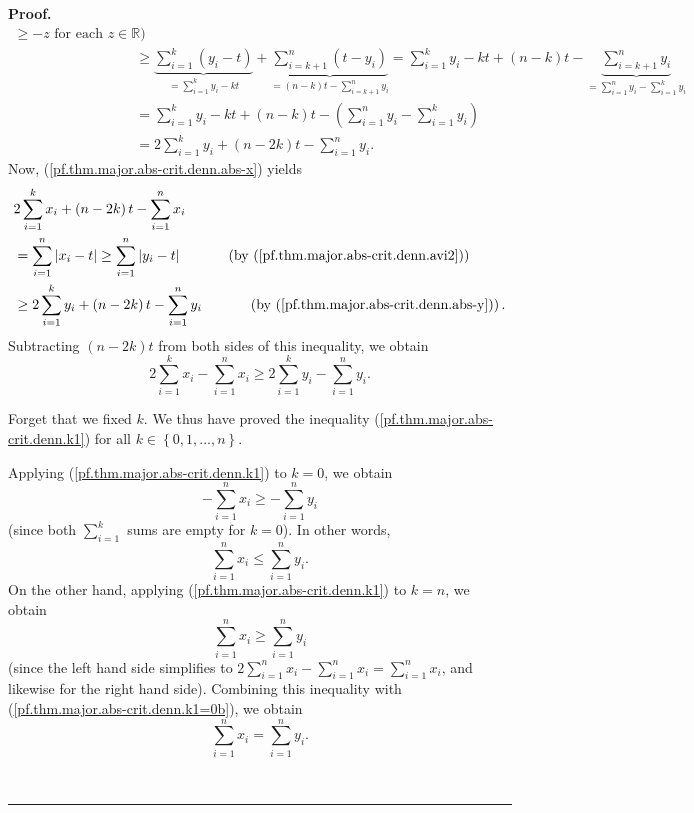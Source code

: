 \documentclass[numbers=enddot,12pt,final,onecolumn,notitlepage]{scrartcl}%
\numberwithin{exer}{subsection}
\theoremstyle{definition}
\newenvironment{proof}[1][Proof]{\noindent\textbf{#1.} }{\ \rule{0.5em}{0.5em}}
\let\sumnonlimits\sum
\renewcommand{\sum}{\sumnonlimits\limits}
\begin{document}
\begin{proof}
\begin{align}
{{\geq-z\text{ for each }z\in\mathbb{R}\text{)}}}\nonumber\\
&  \geq\underbrace{\sum_{i=1}^{k}\left(  y_{i}-t\right)  }_{=\sum_{i=1}%
^{k}y_{i}-kt}+\underbrace{\sum_{i=k+1}^{n}\left(  t-y_{i}\right)  }_{=\left(
n-k\right)  t-\sum_{i=k+1}^{n}y_{i}}=\sum_{i=1}^{k}y_{i}-kt+\left(
n-k\right)  t-\underbrace{\sum_{i=k+1}^{n}y_{i}}_{=\sum_{i=1}^{n}y_{i}%
-\sum_{i=1}^{k}y_{i}}\nonumber\\
&  =\sum_{i=1}^{k}y_{i}-kt+\left(  n-k\right)  t-\left(  \sum_{i=1}^{n}%
y_{i}-\sum_{i=1}^{k}y_{i}\right) \nonumber\\
&  =2\sum_{i=1}^{k}y_{i}+\left(  n-2k\right)  t-\sum_{i=1}^{n}y_{i}.
\label{pf.thm.major.abs-crit.denn.abs-y}%
\end{align}
Now, (\ref{pf.thm.major.abs-crit.denn.abs-x}) yields%
\begin{align*}
&  2\sum_{i=1}^{k}x_{i}+\left(  n-2k\right)  t-\sum_{i=1}^{n}x_{i}\\
&  =\sum_{i=1}^{n}\left\vert x_{i}-t\right\vert \geq\sum_{i=1}^{n}\left\vert
y_{i}-t\right\vert \ \ \ \ \ \ \ \ \ \ \left(  \text{by
(\ref{pf.thm.major.abs-crit.denn.avi2})}\right) \\
&  \geq2\sum_{i=1}^{k}y_{i}+\left(  n-2k\right)  t-\sum_{i=1}^{n}%
y_{i}\ \ \ \ \ \ \ \ \ \ \left(  \text{by
(\ref{pf.thm.major.abs-crit.denn.abs-y})}\right)  .
\end{align*}
Subtracting $\left(  n-2k\right)  t$ from both sides of this inequality, we
obtain%
\begin{equation}
2\sum_{i=1}^{k}x_{i}-\sum_{i=1}^{n}x_{i}\geq2\sum_{i=1}^{k}y_{i}-\sum
_{i=1}^{n}y_{i}. \label{pf.thm.major.abs-crit.denn.k1}%
\end{equation}


Forget that we fixed $k$. We thus have proved the inequality
(\ref{pf.thm.major.abs-crit.denn.k1}) for all $k\in\left\{  0,1,\ldots
,n\right\}  $.

Applying (\ref{pf.thm.major.abs-crit.denn.k1}) to $k=0$, we obtain%
\begin{equation}
-\sum_{i=1}^{n}x_{i}\geq-\sum_{i=1}^{n}y_{i}
\label{pf.thm.major.abs-crit.denn.k1=0}%
\end{equation}
(since both $\sum_{i=1}^{k}$ sums are empty for $k=0$). In other words,%
\begin{equation}
\sum_{i=1}^{n}x_{i}\leq\sum_{i=1}^{n}y_{i}.
\label{pf.thm.major.abs-crit.denn.k1=0b}%
\end{equation}
On the other hand, applying (\ref{pf.thm.major.abs-crit.denn.k1}) to $k=n$, we
obtain%
\begin{equation}
\sum_{i=1}^{n}x_{i}\geq\sum_{i=1}^{n}y_{i}
\label{pf.thm.major.abs-crit.denn.k1=n}%
\end{equation}
(since the left hand side simplifies to $2\sum_{i=1}^{n}x_{i}-\sum_{i=1}%
^{n}x_{i}=\sum_{i=1}^{n}x_{i}$, and likewise for the right hand side).
Combining this inequality with (\ref{pf.thm.major.abs-crit.denn.k1=0b}), we
obtain%
\begin{equation}
\sum_{i=1}^{n}x_{i}=\sum_{i=1}^{n}y_{i}. \label{pf.thm.major.abs-crit.denn.eq}%
\end{equation}



\end{proof}
\end{document}
